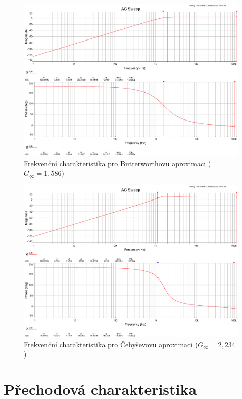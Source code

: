 \documentclass[twoside]{article}
\begin{document}
\begin{figure}[h!]
    \centering
    \includegraphics[width=0.92\linewidth]{bode_butter.pdf}
    \caption{Frekvenční charakteristika pro Butterworthovu aproximaci ($G_{\infty} = 1,586$)}
    \label{fig:bode_butter}
\end{figure}

\begin{figure}[h!]
    \centering
    \includegraphics[width=0.92\linewidth]{bode_cebysev.pdf}
    \caption{Frekvenční charakteristika pro Čebyševovu aproximaci ($G_{\infty} = 2,234$)}
    \label{fig:bode_cebysev}
\end{figure}

\newpage
\section{Přechodová charakteristika}
\end{document}
